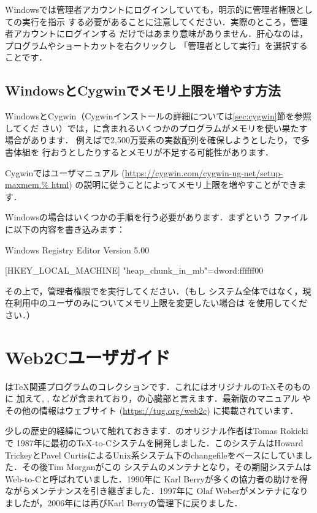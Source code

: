 \documentclass[uplatex,dvipdfmx,tombow]{jsarticle}
\begin{document}
Windowsでは管理者アカウントにログインしていても，明示的に管理者権限としての実行を指示
する必要があることに注意してください．実際のところ，管理者アカウントにログインする
だけではあまり意味がありません．肝心なのは，プログラムやショートカットを右クリックし
「管理者として実行」を選択することです．

\subsection{WindowsとCygwinでメモリ上限を増やす方法}
\label{sec:cygwin-maxmem}

WindowsとCygwin（Cygwinインストールの詳細については\ref{sec:cygwin}節を参照してくだ
さい）では，\TL に含まれるいくつかのプログラムがメモリを使い果たす場合があります．
例えばで2,500万要素の実数配列を確保しようとしたり，\LuaTeX で多書体組を
行おうとしたりするとメモリが不足する可能性があります．

Cygwinではユーザマニュアル (\url{https://cygwin.com/cygwin-ug-net/setup-maxmem.%
html}) の説明に従うことによってメモリ上限を増やすことができます．

Windowsの場合はいくつかの手順を行う必要があります．まずという
ファイルに以下の内容を書き込みます：
%
\begin{sverbatim}
Windows Registry Editor Version 5.00

[HKEY_LOCAL_MACHINE\Software\Cygwin]
"heap_chunk_in_mb"=dword:ffffff00
\end{sverbatim}
%
その上で，管理者権限でを実行してください．（もし
システム全体ではなく，現在利用中のユーザのみについてメモリ上限を変更したい場合は
を使用してください．）

\section{Web2Cユーザガイド}

\Webc は\TeX 関連プログラムのコレクションです．これにはオリジナルの\TeX そのものに
加えて\MF, \MP, \BibTeX などが含まれており，\TL の心臓部と言えます．最新版のマニュアル
やその他の情報はウェブサイト (\url{https://tug.org/web2c}) に掲載されています．

少し\Webc の歴史的経緯について触れておきます．\Webc のオリジナル作者はTomas Rokickiで
1987年に最初の\TeX -to-Cシステムを開発しました．このシステムはHoward TrickeyとPavel
CurtisによるUnix系システム下のchangefileをベースにしていました．その後Tim Morganがこの
システムのメンテナとなり，その期間システムはWeb-to-Cと呼ばれていました．1990年に
Karl Berryが多くの協力者の助けを得ながらメンテナンスを引き継ぎました．1997年に
Olaf Weberがメンテナになりましたが，2006年には再びKarl Berryの管理下に戻りました．
\end{document}
